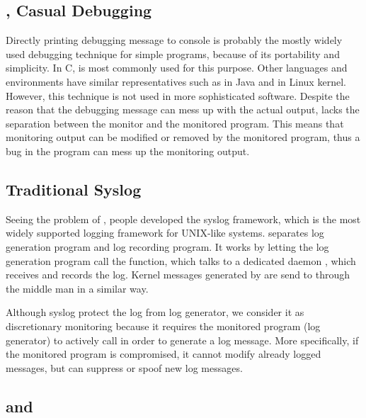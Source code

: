 \subsection{, Casual Debugging}
\label{sec:printf}

Directly printing debugging message to console
is probably the mostly widely used debugging technique
for simple programs, because of its portability and simplicity.
In C,  is most commonly used for this purpose.
Other languages and environments have similar representatives
such as  in Java and
 in Linux kernel.
However, this technique is not used in more sophisticated software.
Despite the reason that the debugging message can mess up
with the actual output,  lacks the
separation between the monitor and the monitored program.
This means that monitoring output can be modified or removed by the monitored
program, thus a bug in the program can mess up the monitoring output.


\subsection{Traditional Syslog}
\label{sec:syslog}

Seeing the problem of , people developed the syslog
framework, which is the most widely supported logging framework for UNIX-like systems.
 separates log generation program and log recording program.
It works by letting the log generation program call the 
function, which talks to a dedicated daemon ,
which receives and records the log.
Kernel messages generated by  are send to  through
the middle man  in a similar way.

Although syslog protect the log from log generator,
we consider it as discretionary monitoring because it
requires the monitored program (log generator) to actively call
 in order to generate a log message.
More specifically, if the monitored program is compromised,
it cannot modify already logged messages, but can suppress or spoof
new log messages.

\subsection{ and }
\label{sec:ptrace}


